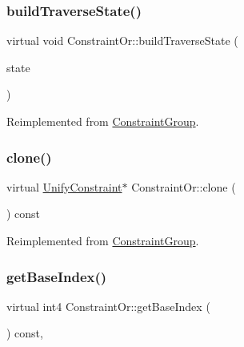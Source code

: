 \subsubsection{\texorpdfstring{buildTraverseState()}{buildTraverseState()}}
{\footnotesize\ttfamily virtual void Constraint\+Or\+::build\+Traverse\+State (\begin{DoxyParamCaption}\item[{\mbox{\hyperlink{class_unify_state}{Unify\+State}} \&}]{state }\end{DoxyParamCaption})\hspace{0.3cm}{\ttfamily [virtual]}}



Reimplemented from \mbox{\hyperlink{class_constraint_group_a2dd52e0b06da735d9ce96f053dfb6bf2}{Constraint\+Group}}.

\mbox{\label{class_constraint_or_ab5e39153f8f49fe816667d0f63848dbf}} 
\subsubsection{\texorpdfstring{clone()}{clone()}}
{\footnotesize\ttfamily virtual \mbox{\hyperlink{class_unify_constraint}{Unify\+Constraint}}$\ast$ Constraint\+Or\+::clone (\begin{DoxyParamCaption}\item[{void}]{ }\end{DoxyParamCaption}) const\hspace{0.3cm}{\ttfamily [virtual]}}



Reimplemented from \mbox{\hyperlink{class_constraint_group_a7121c0ef41bb59e28305e5ddb3c80f35}{Constraint\+Group}}.

\mbox{\label{class_constraint_or_a4ce164e19f57a285919eff135481dea9}} 
\subsubsection{\texorpdfstring{getBaseIndex()}{getBaseIndex()}}
{\footnotesize\ttfamily virtual int4 Constraint\+Or\+::get\+Base\+Index (\begin{DoxyParamCaption}\item[{void}]{ }\end{DoxyParamCaption}) const\hspace{0.3cm}{\ttfamily [inline]}, {\ttfamily [virtual]}}



